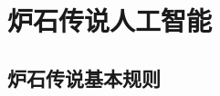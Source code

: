 \section{炉石传说人工智能}
\label{section:HearthstoneAI}
\subsection{炉石传说基本规则}
\label{section:HearthstoneRule}

